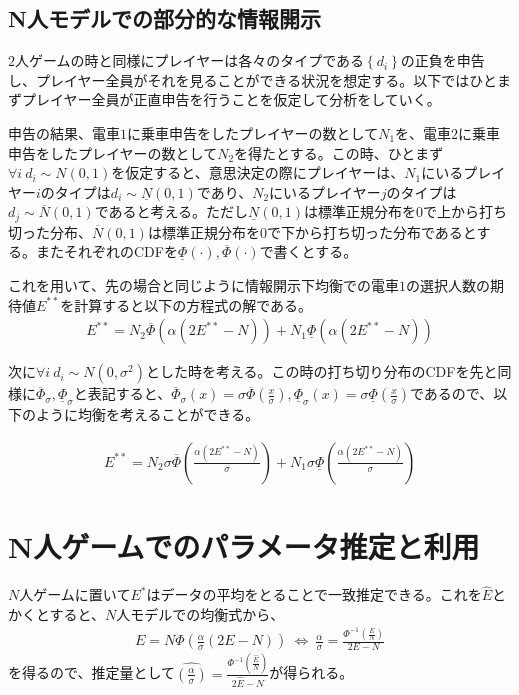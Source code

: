 \documentclass{jsarticle}
\begin{document}
\subsection{N人モデルでの部分的な情報開示}
$2$人ゲームの時と同様にプレイヤーは各々のタイプである$\left\{ d_i \right\}$の正負を申告し、プレイヤー全員がそれを見ることができる状況を想定する。以下ではひとまずプレイヤー全員が正直申告を行うことを仮定して分析をしていく。

申告の結果、電車$1$に乗車申告をしたプレイヤーの数として$N_1$を、電車$2$に乗車申告をしたプレイヤーの数として$N_2$を得たとする。この時、ひとまず$\forall i\ d_i \sim N(0,1)$を仮定すると、意思決定の際にプレイヤーは、$N_1$にいるプレイヤー$i$のタイプは$d_i \sim \underline{N}(0,1)$であり、$N_2$にいるプレイヤー$j$のタイプは$d_j \sim \overline{N}(0,1)$であると考える。ただし$\underline{N}(0,1)$は標準正規分布を$0$で上から打ち切った分布、$\overline{N}(0,1)$は標準正規分布を$0$で下から打ち切った分布であるとする。またそれぞれのCDFを$\underline{\Phi}(\cdot), \overline{\Phi}(\cdot)$で書くとする。

これを用いて、先の場合と同じように情報開示下均衡での電車$1$の選択人数の期待値$E^{**}$を計算すると以下の方程式の解である。
\begin{align}
	E^{**} = N_2 \overline{\Phi} \left(\alpha (2 E^{**} - N)\right) + N_1 \underline{\Phi} \left(\alpha (2 E^{**} - N)\right)
\end{align}

次に$\forall i\ d_i \sim N(0, \sigma^2)$とした時を考える。この時の打ち切り分布のCDFを先と同様に$\overline{\Phi}_{\sigma}, \underline{\Phi}_{\sigma}$と表記すると、$\overline{\Phi}_{\sigma}(x) = \sigma \overline{\Phi}\left( \frac{x}{\sigma} \right), \underline{\Phi}_{\sigma}(x) = \sigma \underline{\Phi}\left( \frac{x}{\sigma} \right)$であるので、以下のように均衡を考えることができる。

\begin{align}
	E^{**} = N_2 \sigma \overline{\Phi} \left(\frac{\alpha (2 E^{**} - N)}{\sigma}\right) + N_1 \sigma \underline{\Phi} \left(\frac{\alpha (2 E^{**} - N)}{\sigma}\right)
\end{align}

\section{N人ゲームでのパラメータ推定と利用}
$N$人ゲームに置いて$E^*$はデータの平均をとることで一致推定できる。これを$\hat{E}$とかくとすると、$N$人モデルでの均衡式から、
\begin{align*}
	E = N\Phi \left(\frac{\alpha}{\sigma}(2 E - N)\right)\ \Leftrightarrow\ \frac{\alpha}{\sigma} = \frac{\Phi^{-1}\left(\frac{E}{N}\right)}{2E - N}
\end{align*}
を得るので、推定量として$\hat{\left(\frac{\alpha}{\sigma}\right)} = \frac{\Phi^{-1}\left(\frac{\hat{E}}{N}\right)}{2\hat{E} - N}$が得られる。
\end{document}
